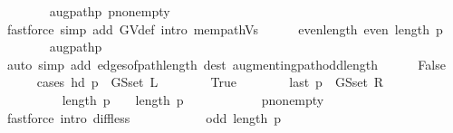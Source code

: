 \begin{isabellebody}
\ \ \ \ \ \ \isamarkupfalse%
\ augpath{\isacharunderscore}{\kern0pt}p\ p{\isacharunderscore}{\kern0pt}non{\isacharunderscore}{\kern0pt}empty\isanewline
\ \ \ \ \ \ \isamarkupfalse%
\ {\isacharparenleft}{\kern0pt}fastforce\ simp\ add{\isacharcolon}{\kern0pt}\ G{\isachardot}{\kern0pt}V{\isacharunderscore}{\kern0pt}def\ intro{\isacharcolon}{\kern0pt}\ mem{\isacharunderscore}{\kern0pt}path{\isacharunderscore}{\kern0pt}Vs{\isacharparenright}{\kern0pt}{\isacharplus}{\kern0pt}\isanewline
\ \ \ \ \isamarkupfalse%
\ even{\isacharunderscore}{\kern0pt}length{\isacharcolon}{\kern0pt}\ {\isachardoublequoteopen}even\ {\isacharparenleft}{\kern0pt}length\ p{\isacharparenright}{\kern0pt}{\isachardoublequoteclose}\isanewline
\ \ \ \ \ \ \isamarkupfalse%
\ augpath{\isacharunderscore}{\kern0pt}p\isanewline
\ \ \ \ \ \ \isamarkupfalse%
\ {\isacharparenleft}{\kern0pt}auto\ simp\ add{\isacharcolon}{\kern0pt}\ edges{\isacharunderscore}{\kern0pt}of{\isacharunderscore}{\kern0pt}path{\isacharunderscore}{\kern0pt}length\ dest{\isacharcolon}{\kern0pt}\ augmenting{\isacharunderscore}{\kern0pt}path{\isacharunderscore}{\kern0pt}odd{\isacharunderscore}{\kern0pt}length{\isacharparenright}{\kern0pt}\isanewline
\ \ \ \ \isamarkupfalse%
\ False\isanewline
\ \ \ \ \isamarkupfalse%
\ {\isacharparenleft}{\kern0pt}cases\ {\isachardoublequoteopen}hd\ p\ {\isasymin}\ G{\isachardot}{\kern0pt}S{\isachardot}{\kern0pt}set\ L{\isachardoublequoteclose}{\isacharparenright}{\kern0pt}\isanewline
\ \ \ \ \ \ \isamarkupfalse%
\ True\isanewline
\ \ \ \ \ \ \isamarkupfalse%
\ {\isachardoublequoteopen}last\ p\ {\isasymin}\ G{\isachardot}{\kern0pt}S{\isachardot}{\kern0pt}set\ R{\isachardoublequoteclose}\isanewline
\ \ \ \ \ \ \isamarkupfalse%
\ {\isacharminus}{\kern0pt}\isanewline
\ \ \ \ \ \ \ \ \isamarkupfalse%
\ {\isachardoublequoteopen}length\ p\ {\isacharminus}{\kern0pt}\ {}\ {\isacharless}{\kern0pt}\ length\ p{\isachardoublequoteclose}\isanewline
\ \ \ \ \ \ \ \ \ \ \isamarkupfalse%
\ p{\isacharunderscore}{\kern0pt}non{\isacharunderscore}{\kern0pt}empty\isanewline
\ \ \ \ \ \ \ \ \ \ \isamarkupfalse%
\ {\isacharparenleft}{\kern0pt}fastforce\ intro{\isacharcolon}{\kern0pt}\ diff{\isacharunderscore}{\kern0pt}less{\isacharparenright}{\kern0pt}\isanewline
\ \ \ \ \ \ \ \ \isamarkupfalse%
\ \isamarkupfalse%
\ {\isachardoublequoteopen}odd\ {\isacharparenleft}{\kern0pt}length\ p\ {\isacharminus}{\kern0pt}\ {}{\isacharparenright}{\kern0pt}{\isachardoublequoteclose}\isanewline

\end{isabellebody}
